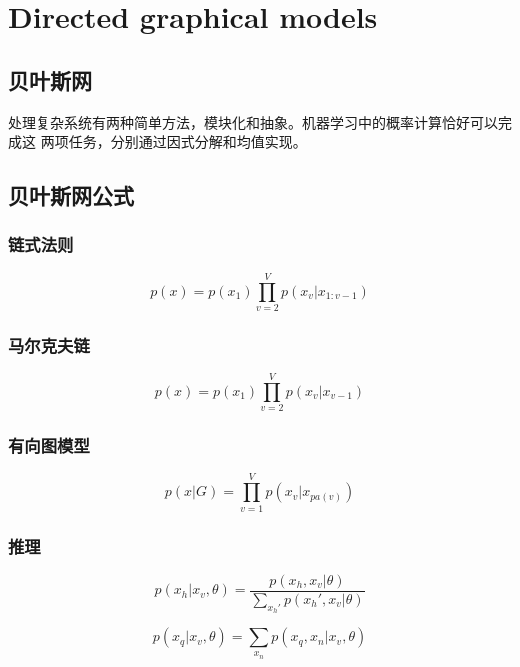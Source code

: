 \chapter{Directed graphical models}
\section{贝叶斯网}
处理复杂系统有两种简单方法，模块化和抽象。机器学习中的概率计算恰好可以完成这
两项任务，分别通过因式分解和均值实现\cite{frey1998graphical, murphy2012machine}。
\section{贝叶斯网公式}
\subsection{链式法则}
\begin{equation}
p(x) = p(x_1)\prod_{v = 2}^Vp(x_v|x_{1:v-1})
\end{equation}

\subsection{马尔克夫链}
\begin{equation}
p(x) = p(x_1)\prod_{v = 2}^Vp(x_v|x_{v-1})
\end{equation}

\subsection{有向图模型}
\begin{equation}
p(x|G) = \prod_{v=1}^Vp(x_v|x_{pa(v)})
\label{bayes_net}
\end{equation}

\subsection{推理}
\begin{equation}
p(x_h|x_v,\theta) = 
\frac{p(x_h, x_v|\theta)}
{\sum_{x_h'}p(x_h', x_v|\theta)}
\end{equation}

\begin{equation}
p(x_q|x_v,\theta) = \sum_{x_n}p(x_q, x_n|x_v, \theta)
\end{equation}

